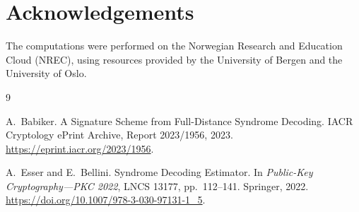 \documentclass[10pt,a4paper]{article}
\begin{document}
\section*{Acknowledgements}
The computations were performed on the Norwegian Research and Education Cloud (NREC), using resources provided by the University of Bergen and the University of Oslo.

\begin{thebibliography}{9}

A.~Babiker.
\newblock A Signature Scheme from Full-Distance Syndrome Decoding.
\newblock IACR Cryptology ePrint Archive, Report 2023/1956, 2023.
\newblock \url{https://eprint.iacr.org/2023/1956}.

A.~Esser and E.~Bellini.
\newblock Syndrome Decoding Estimator.
\newblock In \emph{Public-Key Cryptography---PKC 2022}, LNCS 13177,
pp.~112--141. Springer, 2022.
\newblock \url{https://doi.org/10.1007/978-3-030-97131-1_5}.

\end{thebibliography}
\end{document}
